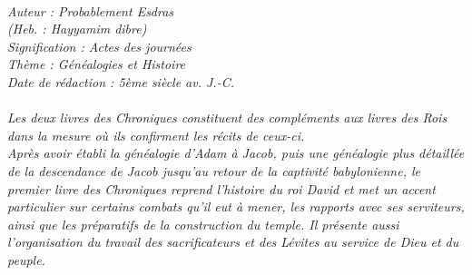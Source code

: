 \BFont
\noindent\hrulefill
{\footnotesize
\textit{
\bigskip
{\centering{}
\\Auteur : Probablement Esdras
\\(Heb. : Hayyamim dibre)
\\Signification : Actes des journées
\\Thème : Généalogies et Histoire
\\Date de rédaction : 5ème siècle av. J.-C.\\}
}
\textit{
\\Les deux livres des Chroniques constituent des compléments aux livres des Rois dans la mesure où ils confirment les récits de ceux-ci.
\\Après avoir établi la généalogie d’Adam à Jacob, puis une généalogie plus détaillée de la descendance de Jacob jusqu’au retour de la captivité babylonienne, le premier livre des Chroniques reprend l’histoire du roi David et met un accent particulier sur certains combats qu’il eut à mener, les rapports avec ses serviteurs, ainsi que les préparatifs de la construction du temple. Il présente aussi l’organisation du travail des sacrificateurs et des Lévites au service de
Dieu et du peuple.\bigskip
}
}
\par\nobreak\noindent\hrulefill
